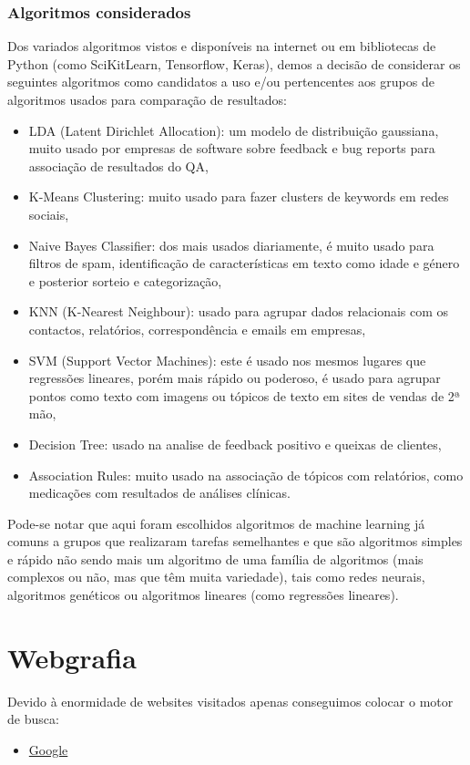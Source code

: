 \documentclass[a4paper,10pt]{article}
\begin{document}
\subsubsection{Algoritmos considerados}

Dos variados algoritmos vistos e disponíveis na internet ou em bibliotecas de Python (como SciKitLearn, Tensorflow, Keras), demos a decisão de considerar os seguintes algoritmos como candidatos a uso e/ou pertencentes aos grupos de algoritmos usados para comparação de resultados:
\begin{itemize}
    \item LDA (Latent Dirichlet Allocation): um modelo de distribuição gaussiana, muito usado por empresas de software sobre feedback e bug reports para associação de resultados do QA,
    \item K-Means Clustering: muito usado para fazer clusters de keywords em redes sociais,
    \item Naive Bayes Classifier: dos mais usados diariamente, é muito usado para filtros de spam, identificação de características em texto como idade e género e posterior sorteio e categorização,
    \item KNN (K-Nearest Neighbour): usado para agrupar dados relacionais com os contactos, relatórios, correspondência e emails em empresas,
    \item SVM (Support Vector Machines): este é usado nos mesmos lugares que regressões lineares, porém mais rápido ou poderoso, é usado para agrupar pontos como texto com imagens ou tópicos de texto em sites de vendas de 2ª mão,
    \item Decision Tree: usado na analise de feedback positivo e queixas de clientes,
    \item Association Rules: muito usado na associação de tópicos com relatórios, como medicações com resultados de análises clínicas.
\end{itemize}

Pode-se notar que aqui foram escolhidos algoritmos de machine learning já comuns a grupos que realizaram tarefas semelhantes e que são algoritmos simples e rápido não sendo mais um algoritmo de uma família de algoritmos (mais complexos ou não, mas que têm muita variedade), tais como redes neurais, algoritmos genéticos ou algoritmos lineares (como regressões lineares).

\section{Webgrafia}

Devido à enormidade de websites visitados apenas conseguimos colocar o motor de busca:
\begin{itemize}
    \item \href{https://www.google.com/}{Google}
\end{itemize}
\end{document}
